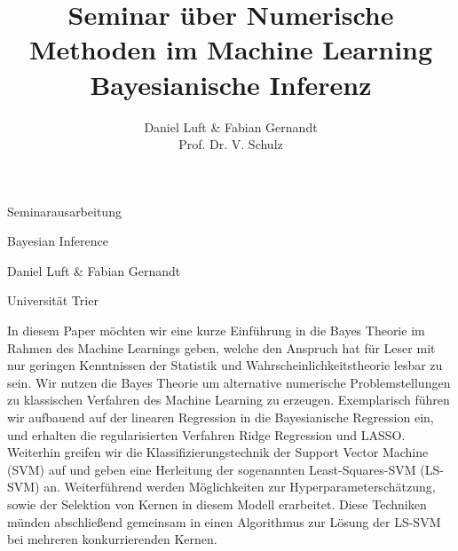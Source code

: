 \documentclass[bibliography=totoc,12pt,a4paper]{scrartcl}
\theoremstyle{exampstyle}
\numberwithin{equation}{section}
\renewenvironment{abstract}
 {\small
  \begin{center}
  \bfseries \abstractname\vspace{-.5em}\vspace{0pt}
  \end{center}
  \list{}{%
    \setlength{\leftmargin}{12mm}%
    \setlength{\rightmargin}{\leftmargin}%
  }%
  \item\relax}
 {\endlist}
\begin{document}
\title{Seminar über Numerische Methoden im Machine Learning \\ Bayesianische Inferenz}

\author{Daniel Luft & Fabian Gernandt \\ Prof. Dr. V. Schulz}

  \pagestyle{empty}

  \begin{titlepage}

    \vspace*{2cm} 

 \begin{center} \large 
    
    Seminarausarbeitung
    \vspace*{2cm}

    {\huge Bayesian Inference}
    \vspace*{2.5cm}

    Daniel Luft \& Fabian Gernandt
    \vspace*{6cm}


	Universität Trier
  \end{center}
\end{titlepage}

  \tableofcontents

\newpage

  \pagestyle{headings}
  
\begin{abstract}
In diesem Paper möchten wir eine kurze Einführung in die Bayes Theorie im Rahmen des Machine Learnings geben, welche den Anspruch hat für Leser mit nur geringen Kenntnissen der Statistik und Wahrscheinlichkeitstheorie lesbar zu sein. Wir nutzen die Bayes Theorie um alternative numerische Problemstellungen zu klassischen Verfahren des Machine Learning zu erzeugen. Exemplarisch führen wir aufbauend auf der linearen Regression in die Bayesianische Regression ein, und erhalten die regularisierten Verfahren Ridge Regression und LASSO. Weiterhin greifen wir die Klassifizierungstechnik der Support Vector Machine (SVM) auf und geben eine Herleitung der sogenannten Least-Squares-SVM (LS-SVM) an. Weiterführend werden Möglichkeiten zur Hyperparameterschätzung, sowie der Selektion von Kernen in diesem Modell erarbeitet. Diese Techniken münden abschließend gemeinsam in einen Algorithmus zur Lösung der LS-SVM bei mehreren konkurrierenden Kernen.
\end{abstract}
\vspace{1cm}






\newpage
\nocite{*}


\end{document}
